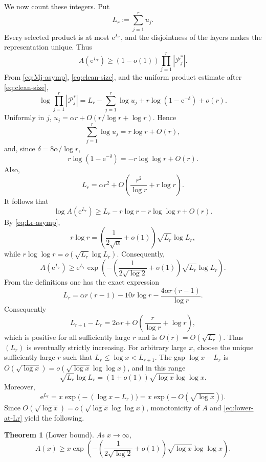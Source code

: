 \documentclass[11pt]{amsart}
\newtheorem{theorem}{Theorem}[section]
\theoremstyle{definition}
\theoremstyle{remark}
\numberwithin{equation}{section}
\newcommand{\e}{\mathrm e}
\newcommand{\Pcal}{\mathcal P}
\begin{document}
We now count these integers.  Put
\begin{equation}\label{eq:Lr}
 L_r:=\sum_{j=1}^r u_j.
\end{equation}
Every selected product is at most $\e^{L_r}$, and the disjointness of the layers makes the representation unique.  Thus
\begin{equation}\label{eq:lower-count-product}
 A(\e^{L_r})\ge(1-o(1))\prod_{j=1}^r|\Pcal_j^*|.
\end{equation}
From \eqref{eq:Mj-asymp}, \eqref{eq:clean-size}, and the uniform product estimate after \eqref{eq:clean-size},
\[
 \log\prod_{j=1}^r|\Pcal_j^*|
 =L_r-\sum_{j=1}^r\log u_j+r\log(1-\e^{-\delta})+o(r).
\]
Uniformly in $j$, $u_j=\alpha r+O(r/\log r+\log r)$.  Hence
\[
 \sum_{j=1}^r\log u_j=r\log r+O(r),
\]
and, since $\delta=8\alpha/\log r$,
\[
 r\log(1-\e^{-\delta})=-r\log\log r+O(r).
\]
Also,
\begin{equation}\label{eq:Lr-asymp}
 L_r=\alpha r^2+O\left(\frac{r^2}{\log r}+r\log r\right).
\end{equation}
It follows that
\begin{equation}\label{eq:lower-subsequence}
 \log A(\e^{L_r})
 \ge L_r-r\log r-r\log\log r+O(r).
\end{equation}
By \eqref{eq:Lr-asymp},
\[
 r\log r
 =\left(\frac1{2\sqrt{\alpha}}+o(1)\right)\sqrt{L_r}\log L_r,
\]
while $r\log\log r=o(\sqrt{L_r}\log L_r)$.  Consequently,
\begin{equation}\label{eq:lower-at-Lr}
 A(\e^{L_r})
 \ge\e^{L_r}\exp\!\left(-\left(\frac1{2\sqrt{\log 2}}+o(1)\right)
 \sqrt{L_r}\log L_r\right).
\end{equation}
From the definitions one has the exact expression
\[
 L_r=\alpha r(r-1)-10r\log r-\frac{4\alpha r(r-1)}{\log r}.
\]
Consequently
\[
 L_{r+1}-L_r=2\alpha r+O\!\left(\frac r{\log r}+\log r\right),
\]
which is positive for all sufficiently large $r$ and is $O(r)=O(\sqrt{L_r})$.  Thus $(L_r)$ is eventually strictly increasing.  For arbitrary large $x$, choose the unique sufficiently large $r$ such that $L_r\le\log x<L_{r+1}$.  The gap $\log x-L_r$ is $O(\sqrt{\log x})=o(\sqrt{\log x}\log\log x)$, and in this range
\[
 \sqrt{L_r}\log L_r=(1+o(1))\sqrt{\log x}\log\log x.
\]
Moreover,
\[
 \e^{L_r}=x\exp\bigl(- (\log x-L_r)\bigr)
 =x\exp\bigl(-O(\sqrt{\log x})\bigr).
\]
Since $O(\sqrt{\log x})=o(\sqrt{\log x}\log\log x)$, monotonicity of $A$ and \eqref{eq:lower-at-Lr} yield the following.

\begin{theorem}[Lower bound]\label{thm:lower}
As $x\to\infty$,
\[
 A(x)\ge x\exp\!\left(-\left(\frac1{2\sqrt{\log 2}}+o(1)\right)
 \sqrt{\log x}\log\log x\right).
\]
\end{theorem}
\end{document}
